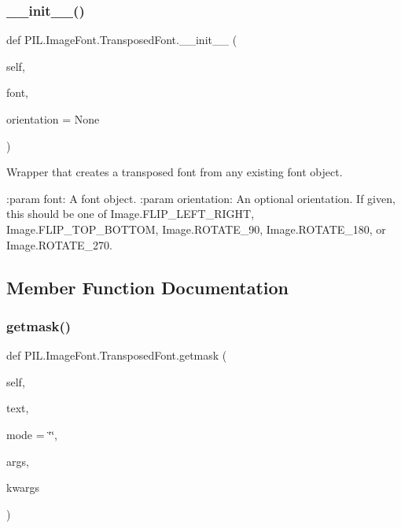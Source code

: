 \subsubsection{\texorpdfstring{\+\_\+\+\_\+init\+\_\+\+\_\+()}{\_\_init\_\_()}}
{\footnotesize\ttfamily def P\+I\+L.\+Image\+Font.\+Transposed\+Font.\+\_\+\+\_\+init\+\_\+\+\_\+ (\begin{DoxyParamCaption}\item[{}]{self,  }\item[{}]{font,  }\item[{}]{orientation = {\ttfamily None} }\end{DoxyParamCaption})}

\begin{DoxyVerb}Wrapper that creates a transposed font from any existing font
object.

:param font: A font object.
:param orientation: An optional orientation.  If given, this should
    be one of Image.FLIP_LEFT_RIGHT, Image.FLIP_TOP_BOTTOM,
    Image.ROTATE_90, Image.ROTATE_180, or Image.ROTATE_270.
\end{DoxyVerb}
 

\subsection{Member Function Documentation}
\mbox{\label{classPIL_1_1ImageFont_1_1TransposedFont_a9e03dec76f549c7f4aeb49977ae75ffd}} 
\subsubsection{\texorpdfstring{getmask()}{getmask()}}
{\footnotesize\ttfamily def P\+I\+L.\+Image\+Font.\+Transposed\+Font.\+getmask (\begin{DoxyParamCaption}\item[{}]{self,  }\item[{}]{text,  }\item[{}]{mode = {\ttfamily \char`\"{}\char`\"{}},  }\item[{}]{args,  }\item[{}]{kwargs }\end{DoxyParamCaption})}

